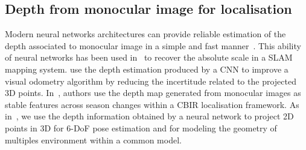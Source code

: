 \subsection{Depth from monocular image for localisation}
Modern neural networks architectures can provide reliable estimation of the depth associated to monocular image in a simple and fast manner~\citep{Eigen2014, Godard2017, Mahjourian2018}. This ability of neural networks has been used in~\citep{Tateno2017} to recover the absolute scale in a SLAM mapping system. \citet{Loo2019} use the depth estimation produced by a CNN to improve a visual odometry algorithm by reducing the incertitude related to the projected 3D points. In~\citep{Piasco2019}, authors use the depth map generated from monocular images as stable features across season changes within a CBIR localisation framework. As in~\citep{Piasco2019a}, we use the depth information obtained by a neural network to project 2D points in 3D for 6-DoF pose estimation and for modeling the geometry of multiples environment within a common model.